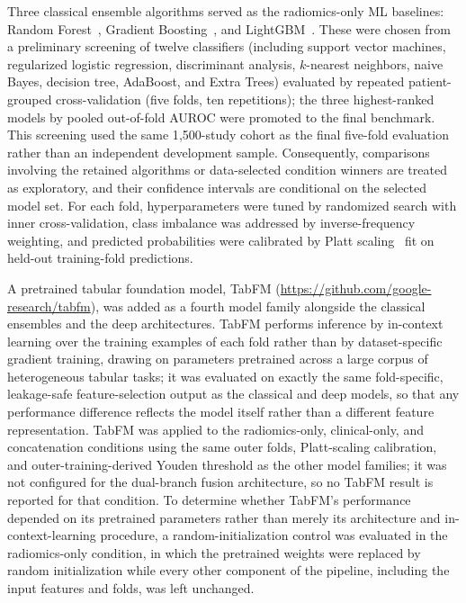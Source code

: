 \documentclass[11pt]{article}
\begin{document}
Three classical ensemble algorithms served as the radiomics-only ML baselines:
Random Forest~\citep{breiman2001random}, Gradient
Boosting~\citep{friedman2001greedy}, and LightGBM~\citep{ke2017lightgbm}. These
were chosen from a preliminary screening of twelve classifiers (including
support vector machines, regularized logistic regression, discriminant analysis,
$k$-nearest neighbors, naive Bayes, decision tree, AdaBoost, and Extra Trees)
evaluated by repeated patient-grouped cross-validation (five folds, ten
repetitions); the three highest-ranked models by pooled out-of-fold AUROC were
promoted to the final benchmark. This screening used the same 1{,}500-study
cohort as the final five-fold evaluation rather than an independent development
sample. Consequently, comparisons involving the retained algorithms or
data-selected condition winners are treated as exploratory, and their confidence
intervals are conditional on the selected model set. For each fold,
hyperparameters were tuned by
randomized search with inner cross-validation, class imbalance was addressed by
inverse-frequency weighting, and predicted probabilities were calibrated by
Platt scaling~\citep{platt1999probabilistic} fit on held-out training-fold
predictions.

A pretrained tabular foundation model, TabFM
(\url{https://github.com/google-research/tabfm}), was added as a fourth model
family alongside the classical ensembles and the deep architectures. TabFM
performs inference by in-context learning over the training examples of each
fold rather than by dataset-specific gradient training, drawing on parameters
pretrained across a large corpus of heterogeneous tabular tasks; it was
evaluated on exactly the same fold-specific, leakage-safe feature-selection
output as the classical and deep models, so that any performance difference
reflects the model itself rather than a different feature representation.
TabFM was applied to the radiomics-only, clinical-only, and concatenation
conditions using the same outer folds, Platt-scaling calibration, and
outer-training-derived Youden threshold as the other model families; it was not
configured for the dual-branch fusion architecture, so no TabFM result is
reported for that condition. To determine whether TabFM's performance depended
on its pretrained parameters rather than merely its architecture and
in-context-learning procedure, a random-initialization control was evaluated in
the radiomics-only condition, in which the pretrained weights were replaced by
random initialization while every other component of the pipeline, including
the input features and folds, was left unchanged.
\end{document}
